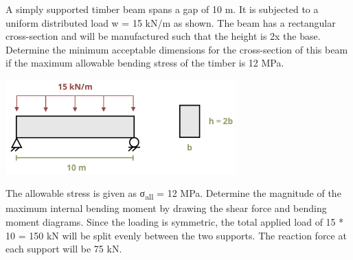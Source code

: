 \documentclass[
  letterpaper,
  DIV=11,
  numbers=noendperiod]{scrreprt}
\begin{document}
\begin{tcolorbox}[enhanced jigsaw, breakable, opacityback=0, toptitle=1mm, left=2mm, colback=white, opacitybacktitle=0.6, colframe=quarto-callout-tip-color-frame, titlerule=0mm, arc=.35mm, leftrule=.75mm, bottomtitle=1mm, colbacktitle=quarto-callout-tip-color!10!white, rightrule=.15mm, title={Example 9.4}, bottomrule=.15mm, toprule=.15mm, coltitle=black]

A simply supported timber beam spans a gap of 10 m. It is subjected to a
uniform distributed load w = 15 kN/m as shown. The beam has a
rectangular cross-section and will be manufactured such that the height
is 2x the base. Determine the minimum acceptable dimensions for the
cross-section of this beam if the maximum allowable bending stress of
the timber is 12 MPa.

\begin{center}
\includegraphics[width=3.48958in,height=\textheight]{images/CH9 PNGs/Example 9.4 part 1.png}
\end{center}

\begin{tcolorbox}[enhanced jigsaw, breakable, opacityback=0, toptitle=1mm, left=2mm, colback=white, opacitybacktitle=0.6, colframe=quarto-callout-tip-color-frame, titlerule=0mm, arc=.35mm, leftrule=.75mm, bottomtitle=1mm, colbacktitle=quarto-callout-tip-color!10!white, rightrule=.15mm, title={Solution}, bottomrule=.15mm, toprule=.15mm, coltitle=black]

The allowable stress is given as σ\textsubscript{all} = 12 MPa.
Determine the magnitude of the maximum internal bending moment by
drawing the shear force and bending moment diagrams. Since the loading
is symmetric, the total applied load of 15 * 10 = 150 kN will be split
evenly between the two supports. The reaction force at each support will
be 75 kN.


\end{tcolorbox}
\end{tcolorbox}
\end{document}
